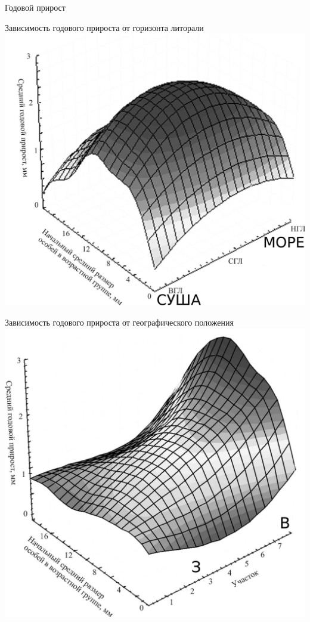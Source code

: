 \documentclass{beamer}
\begin{document}
\begin{frame}{Годовой прирост}
	\begin{minipage}[t]{.45\linewidth}
\begin{center}
	\tiny{Зависимость годового прироста от горизонта литорали}\\
			\includegraphics[width=\textwidth]{prirost_otklik_mareography.jpg}\\
\end{center}
	\end{minipage}
	\begin{minipage}[t]{.45\linewidth}
	\tiny{Зависимость годового прироста от географического положения}
			\includegraphics[height=\textwidth]{prirost_otklik_geography.jpg}
	\end{minipage}
\end{frame}
\end{document}
